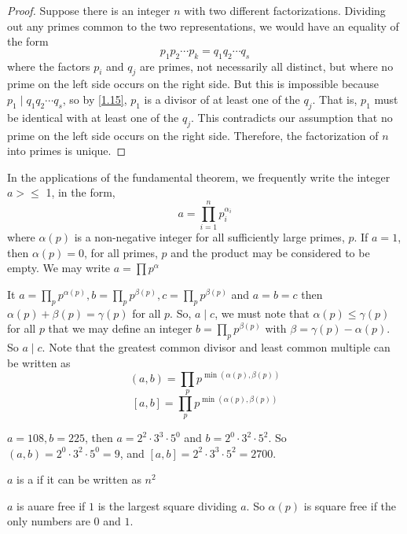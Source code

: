 \documentclass[11pt]{article}
\begin{document}
\begin{proof}
	Suppose there is an integer \(n\) with two different factorizations. Dividing out any primes common to the two representations, we would have an equality of the form
	\[
		p_1 p_2 \cdots p_k = q_1 q_2 \cdots q_s
	\]
	where the factors \(p_i\) and \(q_j\) are primes, not necessarily all distinct,
	but where no prime on the left side occurs on the right side. But this is
	impossible because \(p_1 \mid q_1 q_2 \cdots q_s\), so by \cref{1.15}, \(p_1\)
	is a divisor of at least one of the \(q_j\). That is, \(p_1\) must be identical
	with at least one of the \(q_j\). This contradicts our assumption that no prime
	on the left side occurs on the right side. Therefore, the factorization of
	\(n\) into primes is unique.
\end{proof}

In the applications of the fundamental theorem, we frequently write the integer
\(a > \leqslant\) 1, in the form,
\[
	a = \prod_{i=1}^{n} p_i^{\alpha_i}
\]
where \(\alpha(p)\) is a non-negative integer for all sufficiently large
primes, \(p\). If \(a = 1\), then \(\alpha(p) = 0\), for all primes, \(p\) and
the product may be considered to be empty. We may write \(a = \prod
p^{\alpha}\)

It \(a = \prod_{p} p^{\alpha(p)}, b = \prod_{p} p^{\beta(p)}, c = \prod_{p}
p^{\beta(p)}\) and \(a = b = c\) then \(\alpha(p) + \beta(p) = \gamma(p)\) for
all \(p\). So, \(a \mid c\), we must note that \(\alpha(p) \leqslant
\gamma(p)\) for all \(p\) that we may define an integer \(b =
\prod_{p}p^{\beta(p)}\) with \(\beta = \gamma(p) - \alpha(p)\). So \(a \mid
c\). Note that the greatest common divisor and least common multiple can be
written as \[(a, b) = \prod_{p} p^{\min(\alpha(p), \beta(p))}\] \[[a, b] = \prod_{p} p^{\min(\alpha(p), \beta(p))}\]

\begin{example}
	\(a = 108, b = 225\), then \(a = 2^2 \cdot 3^3 \cdot 5^0\) and \(b = 2^0 \cdot 3^2 \cdot 5^2\). So \((a, b) = 2^0 \cdot 3^2 \cdot 5^0 = 9\), and \([a, b] = 2^2 \cdot 3^3 \cdot 5^2 = 2700\).
\end{example}

\begin{definition}
	\(a\) is a  if it can be written as \(n^2\)
\end{definition}
\begin{remark}
	\(a\) is auare free if \(1\) is the largest square dividing \(a\). So \(\alpha(p)\) is square free if the only numbers are \(0\) and \(1\).
\end{remark}
\end{document}
